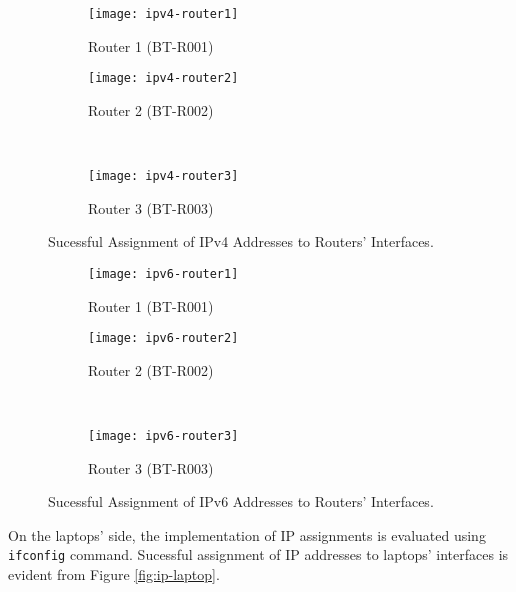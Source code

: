 \begin{figure*}[ht!]
    \centering
    \begin{subfigure}[b]{0.67\textwidth}
        \centering
        \texttt{[image: ipv4-router1]}
        \caption{Router 1 (BT-R001)}
    \end{subfigure}
    \hfill
    \begin{minipage}[b]{0.3\textwidth}
	    \begin{subfigure}[b]{\linewidth}
	        \centering
	        \texttt{[image: ipv4-router2]}
	        \caption{Router 2 (BT-R002)}
	    \end{subfigure}
	    \\
	    \begin{subfigure}[b]{\linewidth}
	        \centering
	        \texttt{[image: ipv4-router3]}
	        \caption{Router 3 (BT-R003)}
	    \end{subfigure}
	\end{minipage}
    \caption{Sucessful Assignment of IPv4 Addresses to Routers' Interfaces.}
    \label{fig:ipv4-router}
\end{figure*}

\begin{figure*}[ht!]
    \centering
    \begin{subfigure}[b]{0.67\textwidth}
        \centering
        \texttt{[image: ipv6-router1]}
        \caption{Router 1 (BT-R001)}
    \end{subfigure}
    \hfill
    \begin{minipage}[b]{0.3\textwidth}
	    \begin{subfigure}[b]{\linewidth}
	        \centering
	        \texttt{[image: ipv6-router2]}
	        \caption{Router 2 (BT-R002)}
	    \end{subfigure}
	    \\
	    \begin{subfigure}[b]{\linewidth}
	        \centering
	        \texttt{[image: ipv6-router3]}
	        \caption{Router 3 (BT-R003)}
	    \end{subfigure}
	\end{minipage}
    \caption{Sucessful Assignment of IPv6 Addresses to Routers' Interfaces.}
    \label{fig:ipv6-router}
\end{figure*}


On the laptops' side, the implementation of IP assignments is evaluated using \texttt{ifconfig} command.
Sucessful assignment of IP addresses to laptops' interfaces is evident from Figure \ref{fig:ip-laptop}.

